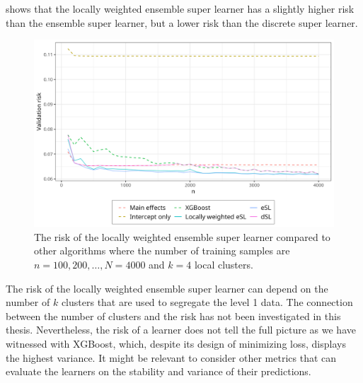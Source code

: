 \documentclass[./main.tex]{subfiles}
\begin{document}
 shows that the locally weighted ensemble super learner has a slightly higher risk than the ensemble super learner, but a lower risk than the discrete super learner. 
\begin{figure}[H]
    \centering
    \includegraphics[width=\textwidth]{figures/losses_esl_lw.png}
    \caption{The risk of the locally weighted ensemble super learner compared to other algorithms where the number of training samples are $ n = 100, 200, \dots , N = 4000 $ and $ k = 4 $ local clusters.}
    \label{fig:losses_esl_lw}
\end{figure}
The risk of the locally weighted ensemble super learner can depend on the number of $ k $ clusters that are used to segregate the level 1 data. The connection between the number of clusters and the risk has not been investigated in this thesis. Nevertheless, the risk of a learner does not tell the full picture as we have witnessed with XGBoost, which, despite its design of minimizing loss, displays the highest variance. It might be relevant to consider other metrics that can evaluate the learners on the stability and variance of their predictions. 
\end{document}
